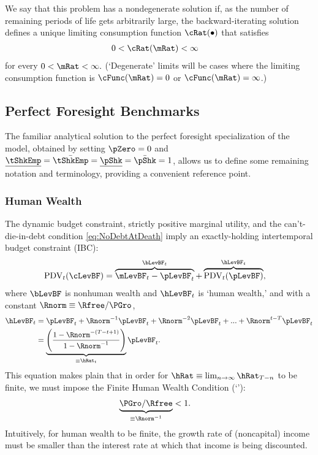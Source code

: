 \documentclass[BufferStockTheory]{subfiles}
\begin{document}
We say that this problem has a nondegenerate solution if, as the number of remaining periods of life gets arbitrarily large, the backward-iterating solution defines a unique limiting consumption function $\cRat(\bullet)$ that satisfies
\begin{align}
  0 & < \cRat(\mRat) <  \infty 
\end{align}
for every $0 < \mRat < \infty.$ (`Degenerate' limits will be cases
where the limiting consumption function is $\cFunc(\mRat)=0$ or $\cFunc(\mRat)=\infty$.)

\hypertarget{Perfect-Foresight-Benchmarks}{}
\subsection{Perfect Foresight Benchmarks}

The familiar analytical solution to the perfect foresight specialization of the model, obtained by setting $\pZero=0$ and $\ushort{\tShkEmp}=\bar{\tShkEmp}=\ushort{\pShk}=\bar{\pShk}=1$, allows us to define some remaining notation and terminology, providing a convenient reference point.

\hypertarget{Human-Wealth}{}
\subsubsection{Human Wealth}
The dynamic budget constraint, strictly positive marginal utility, and the can't-die-in-debt condition \eqref{eq:NoDebtAtDeath} imply an exactly-holding intertemporal budget constraint (IBC):
\begin{align}
  \text{PDV}_{t}(\cLevBF)  & = \overbrace{\mLevBF_{t}-\pLevBF_{t}}^{\bLevBF_{t}}+\overbrace{\text{PDV}_{t}(\pLevBF)}^{\hLevBF_{t}}, \label{eq:IBCFinite}
\end{align}
where $\bLevBF$ is nonhuman wealth and $\hLevBF_{t}$ is `human wealth,' and with a constant $\Rnorm \equiv \Rfree/\PGro$,
\begin{align}
  \hLevBF_{t}  & = \pLevBF_{t}+\Rnorm^{-1} \pLevBF_{t} + \Rnorm^{-2} \pLevBF_{t} + ... + \Rnorm^{t-T} \pLevBF_{t} \label{eq:HDef}
  \\  & = \underbrace{\left(\frac{1-\Rnorm^{-(T-t+1)}}{1-\Rnorm^{-1}}\right)}_{\equiv \hRat_{t}}\pLevBF_{t} .
\end{align}
This equation makes plain that in order for $\hRat \equiv \lim_{n \rightarrow
  \infty} \hRat_{T-n}$ to be finite, we must
impose the Finite Human Wealth Condition (`\FHWC'): \hypertarget{FHWC}{}
\begin{align}
  \underbrace{\PGro/\Rfree}_{\equiv \Rnorm^{-1}}  & < 1 \label{eq:FHWC}.
\end{align}
Intuitively, for human wealth to be finite, the growth rate of (noncapital) income must be smaller than
the interest rate at which that income is being discounted.
\end{document}
